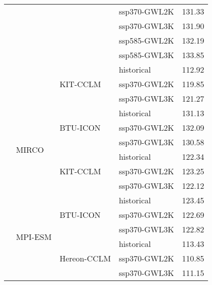 \begin{table}[!htbp]
\begin{tabular}{lll|l|r}
 &  &  & ssp370-GWL2K & 131.33 \\
 &  &  & ssp370-GWL3K & 131.90 \\
 &  &  & ssp585-GWL2K & 132.19 \\
 &  &  & ssp585-GWL3K & 133.85 \\
\cmidrule(lr){3-5}
 &  & \multirow{3}{*}{KIT-CCLM} & historical & 112.92 \\
 &  &  & ssp370-GWL2K & 119.85 \\
 &  &  & ssp370-GWL3K & 121.27 \\
\cmidrule(lr){3-5}
\cmidrule(lr){2-5}
 & \multirow{6}{*}{MIRCO} & \multirow{3}{*}{BTU-ICON} & historical & 131.13 \\
 &  &  & ssp370-GWL2K & 132.09 \\
 &  &  & ssp370-GWL3K & 130.58 \\
\cmidrule(lr){3-5}
 &  & \multirow{3}{*}{KIT-CCLM} & historical & 122.34 \\
 &  &  & ssp370-GWL2K & 123.25 \\
 &  &  & ssp370-GWL3K & 122.12 \\
\cmidrule(lr){3-5}
\cmidrule(lr){2-5}
 & \multirow{6}{*}{MPI-ESM} & \multirow{3}{*}{BTU-ICON} & historical & 123.45 \\
 &  &  & ssp370-GWL2K & 122.69 \\
 &  &  & ssp370-GWL3K & 122.82 \\
\cmidrule(lr){3-5}
 &  & \multirow{3}{*}{Hereon-CCLM} & historical & 113.43 \\
 &  &  & ssp370-GWL2K & 110.85 \\
 &  &  & ssp370-GWL3K & 111.15 \\
\bottomrule
\end{tabular}
\end{table}
